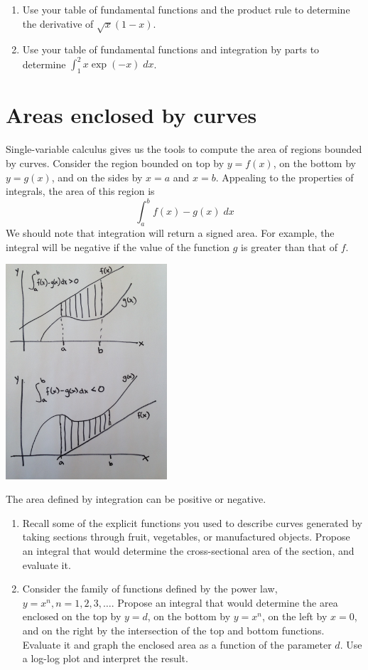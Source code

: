 \documentclass{tufte-handout}
\begin{document}
\begin{enumerate}[resume]
\item Use your table of fundamental functions and the product rule to determine the derivative of $\sqrt{x} (1-x)$.
\item Use your table of fundamental functions and integration by parts to determine $\int_1^2 x \exp(-x) \; dx$.
\end{enumerate}

\section{Areas enclosed by curves}

Single-variable calculus gives us the tools to compute the area of regions bounded by curves. Consider the region bounded on top by $y=f(x)$, on the bottom by $y = g(x)$, and on the sides by $x=a$ and $x=b$. Appealing to the properties of integrals, the area of this region is
\[\int_a^b f(x) - g(x) \; dx \]
We should note that integration will return a signed area. For example, the integral will be negative if the value of the function $g$ is greater than that of $f$.

\begin{marginfigure}
\includegraphics[width=6cm]{figs/signedarea}
\caption{The area defined by integration can be positive or negative.}
\end{marginfigure}

\begin{enumerate}[resume]
\item Recall some of the explicit functions you used to describe curves generated by taking sections through fruit, vegetables, or manufactured objects. Propose an integral that would determine the cross-sectional area of the section, and evaluate it.
\item Consider the family of functions defined by the power law, $y = x^n, n = 1,2,3,\ldots$. Propose an integral that would determine the area enclosed on the top by $y=d$, on the bottom by $y = x^n$, on the left by $x=0$, and on the right by the intersection of the top and bottom functions. Evaluate it and graph the enclosed area as a function of the parameter $d$. Use a log-log plot and interpret the result.
\end{enumerate}
\end{document}
